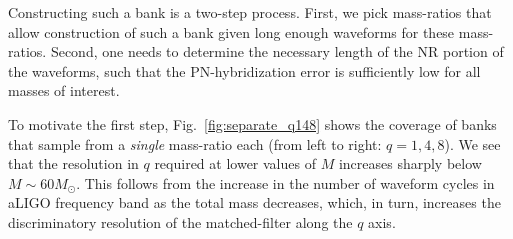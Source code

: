 Constructing such a bank is a two-step process.  First, we pick mass-ratios 
that allow construction of such a bank given long enough waveforms for these
mass-ratios. Second, one needs to determine the necessary length of the NR 
portion of the waveforms, such that the PN-hybridization error is sufficiently
low for all masses of interest.

To motivate the first step, Fig.~\ref{fig:separate_q148} shows the coverage of
banks that sample from a {\em single} mass-ratio each (from left to right: $q=1,4,8$). We see that the resolution
in $q$ required at lower values of $M$ increases sharply below 
$M\sim 60M_\odot$. This follows from the increase in the number of waveform
cycles in aLIGO frequency band as the total mass decreases, which, in turn,
increases the discriminatory resolution of the matched-filter along the $q$ axis.
